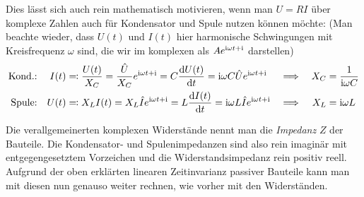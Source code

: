 Dies lässt sich auch rein mathematisch motivieren, wenn man $U = RI$ über komplexe Zahlen auch für Kondensator und Spule nutzen können möchte:
(Man beachte wieder, dass $U(t)$ und $I(t)$ hier harmonische Schwingungen mit Kreisfrequenz $\omega$ sind, die wir im komplexen als $A e^{\mathrm{i} \omega t + \mathrm{i}}$ darstellen)
\begin{align*}
    \text{Kond.:}&& I(t) &\eqqcolon 
        \frac{U(t)}{X_C} = \frac{\hat{U}}{X_C} e^{\mathrm{i} \omega t + \mathrm{i}} 
        = C \dv{U(t)}{t} = \mathrm{i} \omega C \hat{U} e^{\mathrm{i} \omega t + \mathrm{i}}
        & \implies && X_C &= \frac{1}{\mathrm{i} \omega C} \\
    \text{Spule:}&& U(t) &\eqqcolon X_LI(t) = X_L \hat{I} e^{\mathrm{i} \omega t + \mathrm{i}} 
        = L \dv{I(t)}{t} = \mathrm{i} \omega L\hat{I} e^{\mathrm{i} \omega t + \mathrm{i}}  & 
        \implies && X_L &= \mathrm{i} \omega L
\end{align*}


Die verallgemeinerten komplexen Widerstände nennt man die \textit{Impedanz} $Z$ der Bauteile.
Die Kondensator- und Spulenimpedanzen sind also rein imaginär mit entgegengesetztem Vorzeichen und die Widerstandsimpedanz rein positiv reell.
Aufgrund der oben erklärten linearen Zeitinvarianz passiver Bauteile kann man mit diesen nun genauso weiter rechnen, wie vorher mit den Widerständen.


